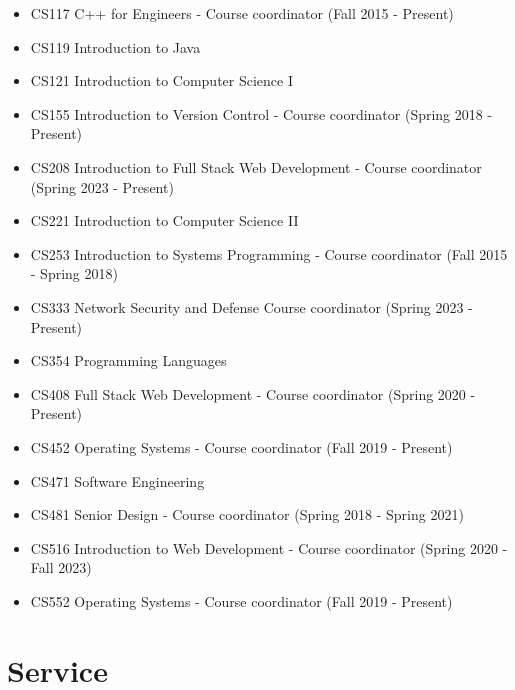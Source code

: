 \documentclass{shanep}
\begin{document}
\begin{itemize}
  \item CS117 C++ for Engineers - Course coordinator (Fall 2015 - Present)
  \item CS119 Introduction to Java
  \item CS121 Introduction to Computer Science I
  \item CS155 Introduction to Version Control - Course coordinator (Spring 2018 - Present)
  \item CS208 Introduction to Full Stack Web Development - Course coordinator (Spring 2023 - Present)
  \item CS221 Introduction to Computer Science II
  \item CS253 Introduction to Systems Programming - Course coordinator (Fall 2015 - Spring 2018)
  \item CS333 Network Security and Defense Course coordinator (Spring 2023 - Present)
  \item CS354 Programming Languages
  \item CS408 Full Stack Web Development - Course coordinator (Spring 2020 - Present)
  \item CS452 Operating Systems - Course coordinator (Fall 2019 - Present)
  \item CS471 Software Engineering
  \item CS481 Senior Design - Course coordinator (Spring 2018 - Spring 2021)
  \item CS516 Introduction to Web Development - Course coordinator (Spring 2020 - Fall 2023)
  \item CS552 Operating Systems - Course coordinator (Fall 2019 - Present)
\end{itemize}

\pagebreak
\section*{Service}
\end{document}
